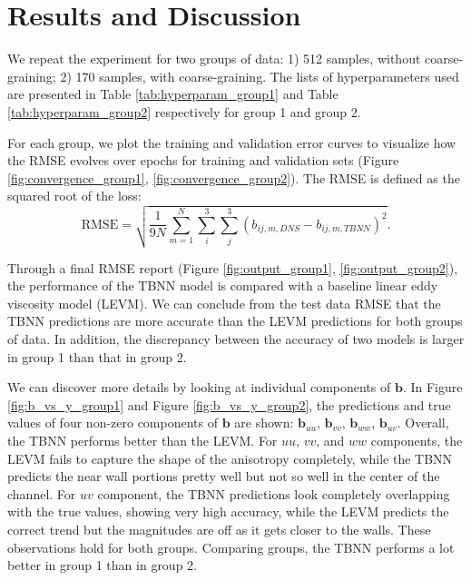 \documentclass{article}
\numberwithin{equation}{section}
\begin{document}
\section{Results and Discussion}

We repeat the experiment for two groups of data: 1) 512 samples, without coarse-graining; 2) 170 samples, with coarse-graining. The lists of hyperparameters used are presented in Table \ref{tab:hyperparam_group1} and Table \ref{tab:hyperparam_group2} respectively for group 1 and group 2. 

For each group, we plot the training and validation error curves to visualize how the RMSE evolves over epochs for training and validation sets (Figure \ref{fig:convergence_group1}, \ref{fig:convergence_group2}). The RMSE is defined as the squared root of the loss: 
\begin{equation}
    \text{RMSE} = \sqrt{\frac{1}{9N}\sum_{m=1}^{N}\sum_i^3\sum_j^3\left(b_{ij,m,DNS}-b_{ij,m,TBNN}\right)^2}.
\end{equation}

Through a final RMSE report (Figure \ref{fig:output_group1}, \ref{fig:output_group2}), the performance of the TBNN model is compared with a baseline linear eddy viscosity model (LEVM). We can conclude from the test data RMSE that the TBNN predictions are more accurate than the LEVM predictions for both groups of data. In addition, the discrepancy between the accuracy of two models is larger in group 1 than that in group 2. 

We can discover more details by looking at individual components of $\mathbf{b}$. In Figure \ref{fig:b_vs_y_group1} and Figure \ref{fig:b_vs_y_group2}, the predictions and true values of four non-zero components of $\mathbf{b}$ are shown: $\mathbf{b}_{uu}$, $\mathbf{b}_{vv}$, $\mathbf{b}_{ww}$, $\mathbf{b}_{uv}$. Overall, the TBNN performs better than the LEVM. For $uu$, $vv$, and $ww$ components, the LEVM fails to capture the shape of the anisotropy completely, while the TBNN predicts the near wall portions pretty well but not so well in the center of the channel. For $uv$ component, the TBNN predictions look completely overlapping with the true values, showing very high accuracy, while the LEVM predicts the correct trend but the magnitudes are off as it gets closer to the walls. These observations hold for both groups. Comparing groups, the TBNN performs a lot better in group 1 than in group 2. 
\end{document}
